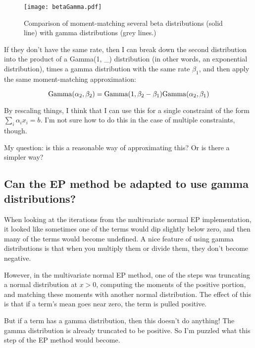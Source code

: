 \documentclass[12]{article}
\begin{document}
\begin{figure}[htp]
\centering
\texttt{[image: betaGamma.pdf]}
\caption{
Comparison of moment-matching several beta distributions (solid line) with
gamma distributions (grey lines.)
}
\label{fig:betaGamma}
\end{figure}

If they don't have the same rate, then I can break down the second distribution into
the product of a Gamma(1, \_) distribution (in other words,
an exponential distribution), times a
gamma distribution with the same rate $\beta_1$, and then apply the same
moment-matching approximation:

\[
{\rm Gamma}(\alpha_2, \beta_2) = {\rm Gamma}(1, \beta_2 - \beta_1){\rm Gamma}(\alpha_2, \beta_1)
\]

By rescaling things, I think that I can use this for a single constraint of the
form $\sum_i \alpha_i x_i = b$. I'm not sure how to do this in the case of
multiple constraints, though.

My question: is this a reasonable way of approximating this? Or is there a simpler
way?

\subsection*{Can the EP method be adapted to use gamma distributions?}

When looking at the iterations from the multivariate normal EP implementation,
it looked like sometimes one of the terms would dip
slightly below zero, and then many of the terms would become undefined.
A nice feature of using gamma distributions is that when you multiply them
or divide them, they don't become negative.

However, in the multivariate normal EP method, one of the steps was 
truncating a normal distribution at $x > 0$, computing the moments of
the positive portion, and matching these moments with another normal
distribution. The effect of this is that if a term's mean goes near zero, the
term is pulled positive.

But if a term has a gamma distribution, then this doesn't do anything! The gamma
distribution is already truncated to be positive. So I'm puzzled what this step
of the EP method would become.



\end{document}
